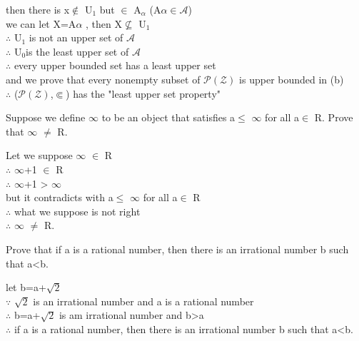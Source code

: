 \documentclass[11pt, a4paper, UTF8]{ctexart}
\begin{document}
\begin{solution}
then there is x$\notin$ U$_1$ but $\in$ A$_\alpha$ (A$\alpha$$\in$$\mathcal{A}$)\\
we can let X=A$\alpha$ , then X$\nsubseteq$  U$_1$\\
$\therefore$ U$_1$ is not an upper set of $\mathcal{A}$\\
$\therefore$ U$_0$is the least upper set of $\mathcal{A}$\\
$\therefore$ every upper bounded set has a least upper set\\
and we prove that every nonempty subset of $\mathcal{P(Z)}$ is upper bounded in (b)\\
$\therefore$ ($\mathcal{P(Z)}$,$\Subset$) has the "least upper set property"

\end{solution}


\begin{problem}[UD:12.20]
Suppose we define $\infty$ to be an object that satisfies a$\le$ $\infty$ for all a$\in$ R. Prove that $\infty$ $\not=$ R.
\end{problem}
\begin{solution}
Let we suppose $\infty$ $\in$ R\\
$\therefore$ $\infty$+1 $\in$ R\\
$\therefore$ $\infty$+1 > $\infty$ \\
but it contradicts with a$\le$ $\infty$ for all a$\in$ R\\
$\therefore$ what we suppose is not right\\
$\therefore$ $\infty$ $\not=$ R.
\end{solution}


\begin{problem}[UD:12.22]
Prove that if a is a rational number, then there is an irrational number b such that a<b.
\end{problem}
\begin{solution}
let b=a+$\sqrt{2}$\\
$\because$ $\sqrt{2}$ is an irrational number and a is a rational number\\
$\therefore$ b=a+$\sqrt{2}$ is am irrational number and b>a\\
$\therefore$ if a is a rational number, then there is an irrational number b such that a<b.\\
\end{solution}
\end{document}
